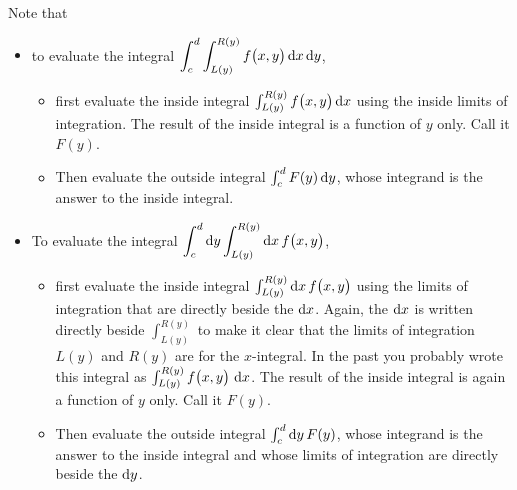 Note that
\begin{itemize}
\item 
to evaluate the integral 
$\displaystyle\int_c^d \int_{L(y)}^{R(y)} f\big(x,y\big)\,\mathrm{d}x\,\mathrm{d}y$,
\begin{itemize}
  \item
  first evaluate the inside integral 
  $\int_{L(y)}^{R(y)} f\big(x,y\big)\,\mathrm{d}x$ using the inside
  limits of integration. The result of the inside integral is a function
  of $y$ only.  Call it $F(y)$.
  \item
   Then evaluate the outside integral $\int_c^d F(y)\,\mathrm{d}y$,
   whose integrand is the answer to the inside integral.
\end{itemize}

\item
To evaluate the integral 
$\displaystyle\int_c^d \mathrm{d}y \int_{L(y)}^{R(y)} \mathrm{d}x\, f\big(x,y\big)$,
\begin{itemize}
  \item
  first evaluate the inside integral 
  $\int_{L(y)}^{R(y)} \mathrm{d}x\, f\big(x,y\big)$ using the limits of 
  integration that are directly beside the $\mathrm{d}x$. 
  Again, the $\mathrm{d}x$
  is written directly beside $\int_{L(y)}^{R(y)}$ to make it clear that
  the limits of integration $L(y)$ and $R(y)$ are for the $x$-integral.
  In the past you probably wrote this integral as 
  $\int_{L(y)}^{R(y)} f\big(x,y\big)\ \mathrm{d}x$.
  The result of the inside integral is again a function of $y$ only.  
  Call it $F(y)$.
  \item
   Then evaluate the outside integral $\int_c^d \mathrm{d}y\,F(y)$,
   whose integrand is the answer to the inside integral and whose limits
   of integration are directly beside the $\mathrm{d}y$.
\end{itemize}
\end{itemize}

